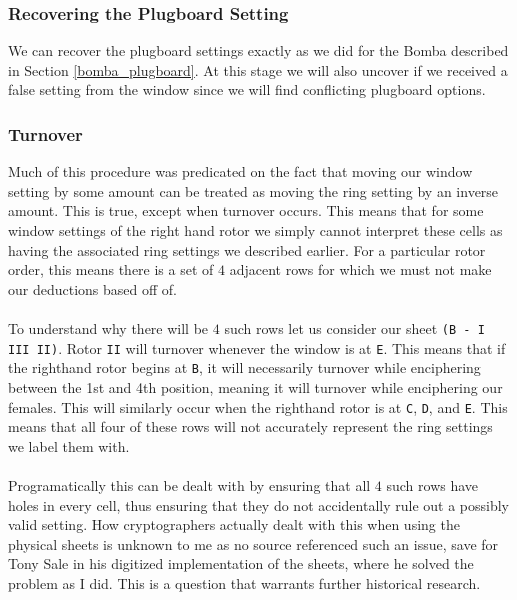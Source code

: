 \subsubsection{Recovering the Plugboard Setting}
We can recover the plugboard settings exactly as we did for the Bomba
described in Section \ref{bomba_plugboard}. At this stage we will
also uncover if we received a false setting from the window since we
will find conflicting plugboard options.

\subsubsection{Turnover}
Much of this procedure was predicated on the fact that moving our
window setting by some amount can be treated as moving the ring
setting by an inverse amount. This is true, except when turnover
occurs. This means that for some window settings of the right hand
rotor we simply cannot interpret these cells as having the associated
ring settings we described earlier. For a particular rotor order,
this means there is a set of $4$ adjacent rows for which we must not
make our deductions based off of.\\\\To understand why there will be
$4$ such rows let us consider our sheet \texttt{(B - I III II)}.
Rotor \texttt{II} will turnover whenever the window is at \texttt{E}.
This means that if the righthand rotor begins at \texttt{B}, it will
necessarily turnover while enciphering between the 1st and 4th
position, meaning it will turnover while enciphering our females.
This will similarly occur when the righthand rotor is at \texttt{C},
\texttt{D}, and \texttt{E}. This means that all four of these rows
will not accurately represent the ring settings we label them with.
\\\\Programatically this can be dealt with by ensuring that all $4$
such rows have holes in every cell, thus ensuring that they do not
accidentally rule out a possibly valid setting. How cryptographers
actually dealt with this when using the physical sheets is unknown to
me as no source referenced such an issue, save for Tony Sale in his
digitized implementation of the sheets, where he solved the problem
as I did. This is a question that warrants further historical research.

